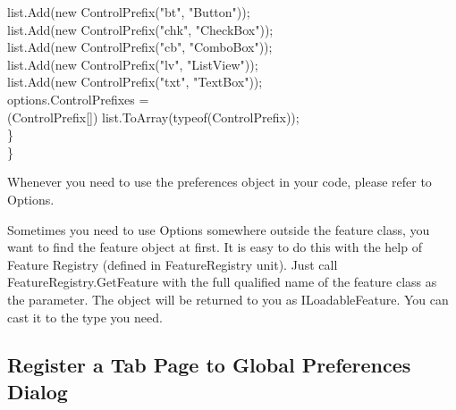 {\tab \tab        list.Add(new ControlPrefix("bt", "Button"));\\
\tab \tab        list.Add(new ControlPrefix("chk", "CheckBox"));\\
\tab \tab        list.Add(new ControlPrefix("cb", "ComboBox"));\\
\tab \tab        list.Add(new ControlPrefix("lv", "ListView"));\\
\tab \tab        list.Add(new ControlPrefix("txt", "TextBox"));\\

\tab \tab		options.ControlPrefixes =\\
\tab \tab \tab (ControlPrefix[]) list.ToArray(typeof(ControlPrefix));\\
\tab     \}\\
\}\\
}


Whenever you need to use the preferences object in your code, please refer to 
Options.

Sometimes you need to use Options somewhere outside the feature class, you want 
to find the feature object at first. It is easy to do this with the help of 
Feature Registry (defined in FeatureRegistry unit). Just call 
FeatureRegistry.GetFeature with the full qualified name of the feature class as 
the parameter. The object will be returned to you as ILoadableFeature. You can 
cast it to the type you need.

\subsection{Register a Tab Page to Global Preferences Dialog}

